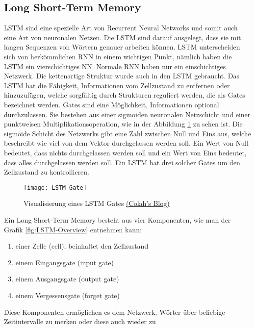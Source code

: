 \subsection{Long Short-Term Memory}
\label{sub:lstm}
\gls{LSTM} sind eine spezielle Art von Recurrent Neural Networks und somit auch eine Art von neuronalen Netzen. Die \gls{LSTM}
sind darauf ausgelegt, dass sie mit langen Sequenzen von Wörtern genauer arbeiten können. \gls{LSTM} unterscheiden sich von
herkömmlichen \gls{RNN} in einem wichtigen Punkt, nämlich haben die \gls{LSTM} ein vierschichtiges \gls{NN}. Normale
\gls{RNN} haben nur ein einschichtiges Netzwerk. Die kettenartige Struktur wurde auch in den \gls{LSTM}
gebraucht.
\newline
\newline
Das \gls{LSTM} hat die Fähigkeit, Informationen vom Zellzustand zu entfernen oder hinzuzufügen, welche sorgfältig durch
Strukturen reguliert werden, die als Gates bezeichnet werden. Gates sind eine Möglichkeit, Informationen optional
durchzulassen. Sie bestehen aus einer sigmoiden neuronalen Netzschicht und einer punktweisen Multiplikationsoperation,
wie in der Abbildung \ref{fig:LSTM-Gate} zu sehen ist. Die sigmoide Schicht des Netzwerks gibt eine Zahl zwischen Null
und Eins aus, welche beschreibt wie viel von dem Vektor durchgelassen werden soll. Ein Wert von Null bedeutet, dass
nichts durchgelassen werden soll und ein Wert von Eins bedeutet, dass alles durchgelassen werden soll. Ein \gls{LSTM}
hat drei solcher Gates um den Zellzustand zu kontrollieren.
\newline
\begin{figure}[H]
	\centering
	\texttt{[image: LSTM\_Gate]}
	\caption{Visualisierung eines LSTM Gates \href{http://colah.github.io/posts/2015-08-Understanding-LSTMs}{(Colah's Blog)}}
	\label{fig:LSTM-Gate}
\end{figure}
\noindent
Ein Long Short-Term Memory besteht aus vier Komponenten, wie man der Grafik \ref{fig:LSTM-Overview} entnehmen kann:
\begin{enumerate}
	\setlength\itemsep{0em}
	\item einer Zelle (cell), beinhaltet den Zellzustand
	\item einem Eingangsgate (input gate)
	\item einem Ausgangsgate (output gate)
	\item einem Vergessensgate (forget gate)
\end{enumerate}
Diese Komponenten ermöglichen es dem Netzwerk, Wörter über beliebige Zeitintervalle zu merken oder diese auch wieder zu
